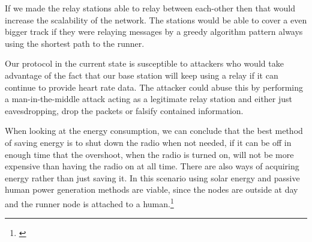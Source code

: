 \noindent If we made the relay stations able to relay between each-other then that would increase the scalability of the network. The stations would be able to cover a even bigger track if they were relaying messages by a greedy algorithm pattern always using the shortest path to the runner.

\noindent Our protocol in the current state is susceptible to attackers who would take advantage of the fact that our base station will keep using a relay if it can continue to provide heart rate data. The attacker could abuse this by performing a man-in-the-middle attack acting as a legitimate relay station and either just eavesdropping, drop the packets or falsify contained information.

\noindent When looking at the energy consumption, we can conclude that the best method of saving energy is to shut down the radio when not needed, if it can be off in enough time that the overshoot, when the radio is turned on, will not be more expensive than having the radio on at all time. There are also ways of acquiring energy rather than just saving it. In this scenario using solar energy and passive human power generation methods are viable, since the nodes are outside at day and the runner node is attached to a human.\footnote{\cite{Sudevalayam2011}}
